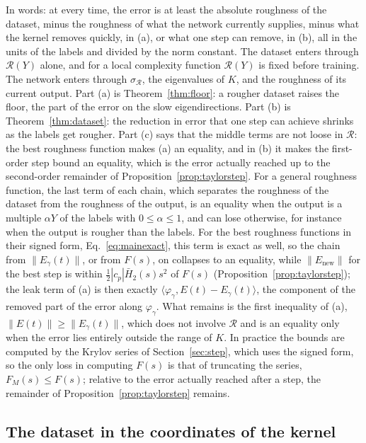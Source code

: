 \documentclass[11pt]{article}
\theoremstyle{definition}
\theoremstyle{remark}
\newcommand{\Rgh}{\mathcal{R}}           %
\newcommand{\sR}{\sigma_{\Rgh}}
\newcommand{\ip}[2]{\langle #1,#2\rangle}
\begin{document}
In words: at every time, the error is at least the absolute roughness of the dataset, minus the roughness of what the network currently supplies, minus what the kernel removes quickly, in (a), or what one step can remove, in (b), all in the units of the labels and divided by the norm constant.
The dataset enters through $\Rgh(Y)$ alone, and for a local complexity function $\Rgh(Y)$ is fixed before training.
The network enters through $\sR$, the eigenvalues of $K$, and the roughness of its current output.
Part (a) is Theorem~\ref{thm:floor}: a rougher dataset raises the floor, the part of the error on the slow eigendirections.
Part (b) is Theorem~\ref{thm:dataset}: the reduction in error that one step can achieve shrinks as the labels get rougher.
Part (c) says that the middle terms are not loose in $\Rgh$: the best roughness function makes (a) an equality, and in (b) it makes the first-order step bound an equality, which is the error actually reached up to the second-order remainder of Proposition~\ref{prop:taylorstep}.
For a general roughness function, the last term of each chain, which separates the roughness of the dataset from the roughness of the output, is an equality when the output is a multiple $\alpha Y$ of the labels with $0 \le \alpha \le 1$, and can lose otherwise, for instance when the output is rougher than the labels.
For the best roughness functions in their signed form, Eq.~\eqref{eq:mainexact}, this term is exact as well, so the chain from $\|E_\gamma(t)\|$, or from $F(s)$, on collapses to an equality, while $\|E_{\mathrm{new}}\|$ for the best step is within $\tfrac12|c_p|\bar H_2(s)s^2$ of $F(s)$ (Proposition~\ref{prop:taylorstep}); the leak term of (a) is then exactly $\ip{\varphi_\gamma}{E(t) - E_\gamma(t)}$, the component of the removed part of the error along $\varphi_\gamma$.
What remains is the first inequality of (a), $\|E(t)\| \ge \|E_\gamma(t)\|$, which does not involve $\Rgh$ and is an equality only when the error lies entirely outside the range of $K$.
In practice the bounds are computed by the Krylov series of Section~\ref{sec:step}, which uses the signed form, so the only loss in computing $F(s)$ is that of truncating the series, $F_M(s) \le F(s)$; relative to the error actually reached after a step, the remainder of Proposition~\ref{prop:taylorstep} remains.

\subsection{The dataset in the coordinates of the kernel}\label{sec:kernelcoords}
\end{document}
